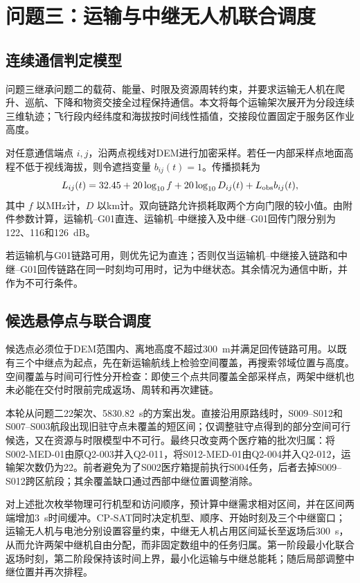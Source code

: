 \section{问题三：运输与中继无人机联合调度}

\subsection{连续通信判定模型}

问题三继承问题二的载荷、能量、时限及资源周转约束，并要求运输无人机在爬升、巡航、下降和物资交接全过程保持通信。本文将每个运输架次展开为分段连续三维轨迹；飞行段内经纬度和海拔按时间线性插值，交接段位置固定于服务区作业高度。

对任意通信端点 $i,j$，沿两点视线对DEM进行加密采样。若任一内部采样点地面高程不低于视线海拔，则令遮挡变量 $b_{ij}(t)=1$。传播损耗为
\[
L_{ij}(t)=32.45+20\log_{10}f+20\log_{10}D_{ij}(t)
            +L_{\rm obs}b_{ij}(t),
\]
其中 $f$ 以MHz计，$D$ 以km计。双向链路允许损耗取两个方向门限的较小值。由附件参数计算，运输机--G01直连、运输机--中继接入及中继--G01回传门限分别为122、116和126~dB。

若运输机与G01链路可用，则优先记为直连；否则仅当运输机--中继接入链路和中继--G01回传链路在同一时刻均可用时，记为中继状态。其余情况为通信中断，并作为不可行条件。

\subsection{候选悬停点与联合调度}

候选点必须位于DEM范围内、离地高度不超过300~m并满足回传链路可用。以既有三个中继点为起点，先在新运输航线上检验空间覆盖，再搜索邻域位置与高度。空间覆盖与时间可行性分开检查：即使三个点共同覆盖全部采样点，两架中继机也未必能在交付时限前完成返场、周转和再次建链。

本轮从问题二22架次、5830.82~s的方案出发。直接沿用原路线时，S009--S012和S007--S003航段出现旧驻守点未覆盖的短区间；仅调整驻守点得到的部分空间可行候选，又在资源与时限模型中不可行。最终只改变两个医疗箱的批次归属：将S002-MED-01由原Q2-003并入Q2-011，将S012-MED-01由Q2-004并入Q2-012，运输架次数仍为22。前者避免为了S002医疗箱提前执行S004任务，后者去掉S009--S012跨区航段；其余覆盖缺口通过西部中继位置调整消除。

对上述批次枚举物理可行机型和访问顺序，预计算中继需求相对区间，并在区间两端增加3~s时间缓冲。CP-SAT同时决定机型、顺序、开始时刻及三个中继窗口；运输无人机与电池分别设置容量约束，中继无人机占用区间延长至返场后300~s，从而允许两架中继机自由分配，而非固定数组中的任务归属。第一阶段最小化联合返场时刻，第二阶段保持该时间上界，最小化运输与中继总能耗；随后局部调整中继位置并再次排程。

